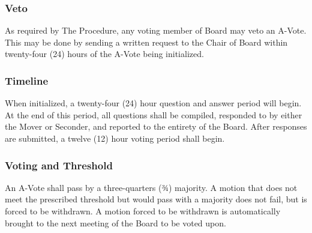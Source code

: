 \subsubsection{Veto}
As required by The Procedure, any voting member of Board may veto an A-Vote.
This may be done by sending a written request to the Chair of Board within twenty-four (24) hours of the A-Vote being initialized.

\subsubsection{Timeline}
When initialized, a twenty-four (24) hour question and answer period will begin.
At the end of this period, all questions shall be compiled, responded to by either the Mover or Seconder, and reported to the entirety of the Board.
After responses are submitted, a twelve (12) hour voting period shall begin.

\subsubsection{Voting and Threshold}
An A-Vote shall pass by a three-quarters (¾) majority.
A motion that does not meet the prescribed threshold but would pass with a majority does not fail, but is forced to be withdrawn.
A motion forced to be withdrawn is automatically brought to the next meeting of the Board to be voted upon.